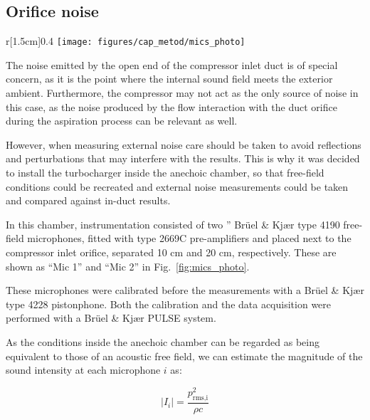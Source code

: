 \subsection{Orifice noise}
\label{sub:metod_orifice_noise}

\begin{wrapfigure}[19]{r}[1.5cm]{0.4\textwidth}
\centering
\vspace{-4mm}
\texttt{[image: figures/cap\_metod/mics\_photo]}
\caption[Image of the orifice free-field microphones]{Image of the two free-field microphones placed at 10 mm (Mic 1) and 20 mm (Mic 2) from the orifice of the compressor inlet duct.}
\label{fig:mics_photo}
\end{wrapfigure}

The noise emitted by the open end of the compressor inlet duct is of special concern, as it is the point where the internal sound field meets the exterior ambient. Furthermore, the compressor may not act as the only source of noise in this case, as the noise produced by the flow interaction with the duct orifice during the aspiration process can be relevant as well.

However, when measuring external noise care should be taken to avoid reflections and perturbations that may interfere with the results. This is why it was decided to install the turbocharger inside the anechoic chamber, so that free-field conditions could be recreated and external noise measurements could be taken and compared against in-duct results.

In this chamber, instrumentation consisted of two '' Brüel \& Kjær type 4190 free-field microphones, fitted with type 2669C pre-amplifiers and placed next to the compressor inlet orifice, separated 10 cm and 20 cm, respectively. These are shown as ``Mic 1'' and ``Mic 2'' in Fig.~\ref{fig:mics_photo}.

These microphones were calibrated before the measurements with a Brüel \& Kjær type 4228 pistonphone. Both the calibration and the data acquisition were performed with a Brüel \& Kjær PULSE system.

As the conditions inside the anechoic chamber can be regarded as being equivalent to those of an acoustic free field, we can estimate the magnitude of the sound intensity at each microphone $i$ as:

\begin{equation}
	|I_i| = \frac{p^2_\text{rms,i}}{\rho c}
\end{equation}

